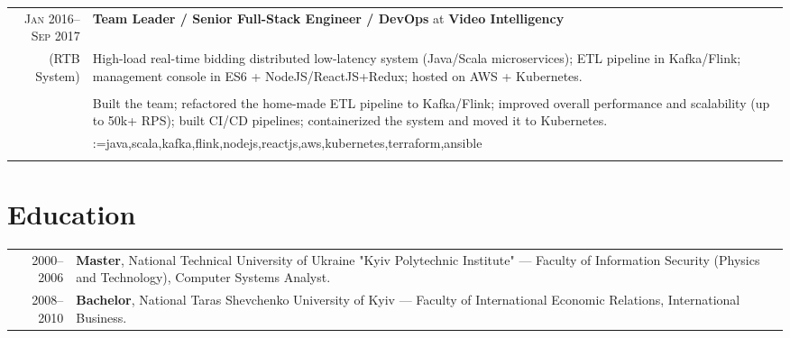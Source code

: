 \documentclass[a4paper,11pt]{article}
\makeatletter
\newcommand{\sotag}[1]{\tikz[baseline]{\node[anchor=base, rounded corners=0.5ex, text height=1.5ex, text depth=.25ex, fill=tagbg, draw=tagbg, text=tagtxt] {#1};}}
\newcommand{\sotagrow}[1]{\\[0.35em]& \@for\sotagitem:=#1\do{\sotag{\sotagitem} }\\}
\newcommand{\job}[2]{\large\sffamily \textbf{#1} at \textbf{#2}\rule[-0.45em]{0pt}{1.45em}}
\newcommand{\sep}{\multicolumn{2}{c}{}\\}
\makeatother
\begin{document}
\begin{longtable}{r|p{}}
  \textsc{Jan 2016--Sep 2017} & \job{Team Leader / Senior Full-Stack Engineer / DevOps}{Video Intelligency} \\(RTB System)
    &High-load real-time bidding distributed low-latency system (Java/Scala microservices); ETL pipeline in Kafka/Flink; management console in ES6 + NodeJS/ReactJS+Redux; hosted on AWS + Kubernetes.\\&\\
    &Built the team; refactored the home-made ETL pipeline to Kafka/Flink; improved overall performance and scalability (up to 50k+ RPS); built CI/CD pipelines; containerized the system and moved it to Kubernetes.\sotagrow{java,scala,kafka,flink,nodejs,reactjs,aws,kubernetes,terraform,ansible}\sep

\end{longtable}

\section{Education}
\begin{tabular}{rp{}}
  \textsc{2000--2006} & \textbf{Master}, National Technical University of Ukraine "Kyiv Polytechnic Institute" --- Faculty of Information Security (Physics and Technology), Computer Systems Analyst.\\[0.4em]
  \textsc{2008--2010} & \textbf{Bachelor}, National Taras Shevchenko University of Kyiv --- Faculty of International Economic Relations, International Business.\\
\end{tabular}
\end{document}
